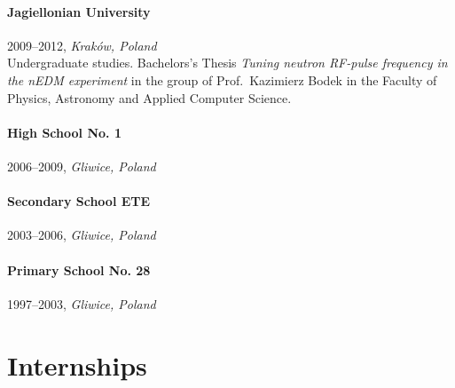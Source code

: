 \paragraph{Jagiellonian University} 2009--2012, \emph{Kraków, Poland}\\
Undergraduate studies. Bachelors's Thesis \emph{Tuning neutron RF-pulse frequency in the nEDM experiment} in the group of Prof.\ Kazimierz Bodek in the
Faculty of Physics, Astronomy and Applied Computer Science.

\paragraph{High School No. 1} 2006--2009, \emph{Gliwice, Poland}

\paragraph{Secondary School ETE} 2003--2006, \emph{Gliwice, Poland}

\paragraph{Primary School No. 28} 1997--2003, \emph{Gliwice, Poland}







\bigskip

\section*{Internships}
